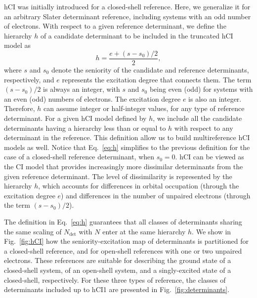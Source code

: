 \documentclass[aip,jcp,reprint,noshowkeys,superscriptaddress]{revtex4-1}
\newcommand{\Ndet}{N_\text{det}}
\begin{document}
hCI was initially introduced for a closed-shell reference. \cite{Kossoski_2022}
Here, we generalize it for an arbitrary Slater determinant reference, including systems with an odd number of electrons.
With respect to a given reference determinant, we define the hierarchy $h$ of a candidate determinant to be included in the truncated hCI model as
\begin{equation}
  \label{eq:h}
  h = \frac{e+ (s-s_0)/2}{2},
\end{equation}
where $s$ and $s_0$ denote the seniority of the candidate and reference determinants, respectively, and $e$ represents the excitation degree that connects them.
The term $(s-s_0)/2$ is always an integer, with $s$ and $s_0$ being even (odd) for systems with an even (odd) numbers of electrons. The excitation degree $e$ is also an integer.
Therefore, $h$ can assume integer or half-integer values, for any type of reference determinant.
For a given hCI model defined by $h$, we include all the candidate determinants having a hierarchy less than or equal to $h$ with respect to any determinant in the reference.
This definition allow us to build multireference hCI models as well.
Notice that Eq.~\eqref{eq:h} simplifies to the previous definition \cite{Kossoski_2022} for the case of a closed-shell reference determinant, when $s_0 = 0$.
hCI can be viewed as the CI model that provides increasingly more dissimilar determinants from the given reference determinant.
The level of dissimilarity is represented by the hierarchy $h$, which accounts for differences in orbital occupation (through the excitation degree $e$)
and differences in the number of unpaired electrons (through the term $(s-s_0)/2$).

The definition in Eq.~\eqref{eq:h} guarantees that all classes of determinants sharing the same scaling of $\Ndet$ with $N$ enter at the same hierarchy $h$.
We show in Fig.~\ref{fig:hCI} how the seniority-excitation map of determinants is partitioned for a closed-shell reference, and for open-shell references with one or two unpaired electrons.
These references are suitable for describing the ground state of a closed-shell system, of an open-shell system, and a singly-excited state of a closed-shell, respectively.
For these three types of reference, the classes of determinants included up to hCI1 are presented in Fig.~\ref{fig:determinants}.
\end{document}
